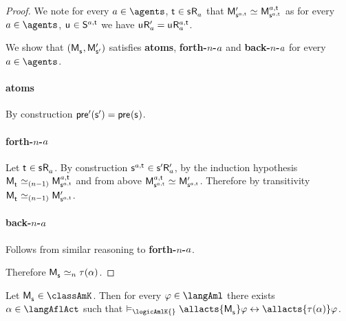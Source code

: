 \begin{proof}
    We note for every $\agentA \in \agents$, $\aStateT \in \aStateS \aAccessibility{\agentA}$ that $\aPModel[\prime]{\aStateS[\agentA,\aStateT]} \bisimilar \aPModel[\agentA,\aStateT]{\aStateS[\agentA,\aStateT]}$ as for every $\agentA \in \agents$, $\aStateU \in \aStates[\agentA,\aStateT]$ we have $\aStateU \aAccessibility[\prime]{\agentA} = \aStateU \aAccessibility[\agentA,\aStateT]{\agentA}$.
    
    We show that $(\aPModel{\aStateS}, \aPModel[\prime]{\aStateS[\prime]})$ satisfies {\bf atoms}, {\bf forth-$n$-$a$} and {\bf back-$n$-$a$} for every $\agentA \in \agents$.

    \paragraph{atoms} By construction
    $\aPrecondition[\prime](\aStateS[\prime]) = \aPrecondition(\aStateS)$.

    \paragraph{forth-$n$-$a$} 
    Let $\aStateT \in \aStateS \aAccessibility{\agentA}$.
    By construction $\aStateS[\agentA,\aStateT] \in \aStateS[\prime] \aAccessibility[\prime]{\agentA}$, by the induction hypothesis $\aPModel{\aStateT} \bisimilar[(n - 1)] \aPModel[\agentA,\aStateT]{\aStateS[\agentA,\aStateT]}$ and from above $\aPModel[\agentA,\aStateT]{\aStateS[\agentA,\aStateT]} \bisimilar \aPModel[\prime]{\aStateS[\agentA,\aStateT]}$.
    Therefore by transitivity $\aPModel{\aStateT} \bisimilar[(n - 1)] \aPModel[\prime]{\aStateS[\agentA,\aStateT]}$.

    \paragraph{back-$n$-$a$} Follows from similar reasoning to {\bf forth-$n$-$a$}.

    Therefore $\aPModel{\aStateS} \bisimilar[n] \tau(\alpha)$.
\end{proof}

\begin{corollary}\label{afl-k-correspondence-aml-allacts}
    Let $\aPModel{\aStateS} \in \classAmK$.
    Then for every $\phi \in \langAml$ there exists $\alpha \in \langAflAct$ such that $\entails_\logicAmlK{} \allacts{\aPModel{\aStateS}} \phi \iff \allacts{\tau(\alpha)} \phi$.
\end{corollary}

